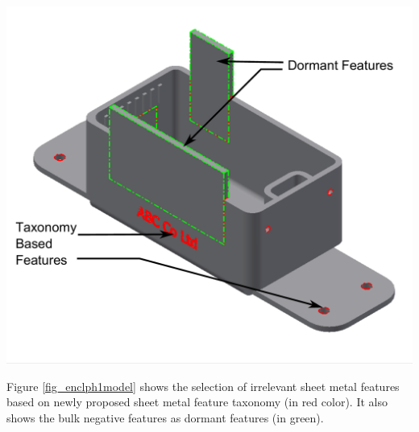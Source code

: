 


\begin{minipage}{\linewidth}
\begin{minipage}[c]{0.62\linewidth}
\includegraphics[width=\linewidth,valign=t]{../Common/images/SheetMetal_Medium_Enclosure_PhaseISelections_2}

 \label{fig_enclph1model}

\bigskip

Figure \ref{fig_enclph1model} shows the selection of irrelevant sheet metal features based on newly proposed sheet metal feature taxonomy  (in red color). It also shows the bulk negative features as dormant features (in green).  %


\end{minipage}
\end{minipage}
